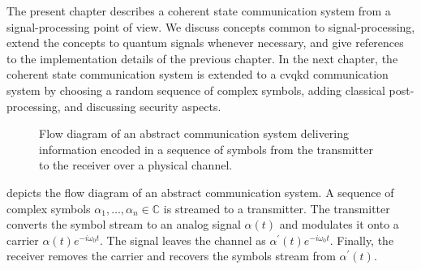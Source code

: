 The present chapter describes a coherent state communication system from a signal-processing point of view.
We discuss concepts common to signal-processing, extend the concepts to quantum signals whenever necessary, and give references to the implementation details of the previous chapter.
In the next chapter, the coherent state communication system is extended to a \gls{cvqkd} communication system by choosing a random sequence of complex symbols, adding classical post-processing, and discussing security aspects.

\begin{figure}[htb]
	\centering
	
	\caption{Flow diagram of an abstract communication system delivering information encoded in a sequence of symbols from the transmitter to the receiver over a physical channel.}\label{fig:communication_system}
\end{figure}
 depicts the flow diagram of an abstract communication system.
A sequence of complex symbols $\alpha_1,\dots,\alpha_n\in\mathbb{C}$ is streamed to a transmitter.
The transmitter converts the symbol stream to an analog signal $\alpha(t)$ and modulates it onto a carrier $\alpha(t)e^{-i\omega_0t}$.
The signal leaves the channel as $\alpha^\prime(t)e^{-i\omega_0t}$.
Finally, the receiver removes the carrier and recovers the symbols stream from $\alpha^\prime(t)$.

